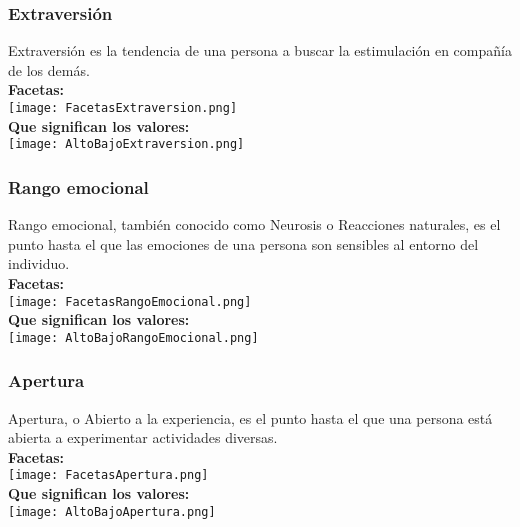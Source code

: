 \documentclass[10pt]{article}
\begin{document}
        \subsubsection{Extraversión}
                Extraversión es la tendencia de una persona a buscar la estimulación en compañía de los demás.\\                
                \textbf{Facetas:}\\
                \texttt{[image: FacetasExtraversion.png]}\\
                \textbf{Que significan los valores:}\\ 
                \texttt{[image: AltoBajoExtraversion.png]}\\
        
        \subsubsection{Rango emocional}
                Rango emocional, también conocido como Neurosis o Reacciones naturales, es el punto hasta el que las emociones de una persona son sensibles al entorno del individuo.\\
                
                \textbf{Facetas:}\\
                \texttt{[image: FacetasRangoEmocional.png]}\\
                \textbf{Que significan los valores:}\\ 
                \texttt{[image: AltoBajoRangoEmocional.png]}\\
                
        \subsubsection{Apertura}
                Apertura, o Abierto a la experiencia, es el punto hasta el que una persona está abierta a experimentar actividades diversas.\\
                
                \textbf{Facetas:}\\
                \texttt{[image: FacetasApertura.png]}\\
                \textbf{Que significan los valores:}\\ 
                \texttt{[image: AltoBajoApertura.png]}\\
                
\end{document}
